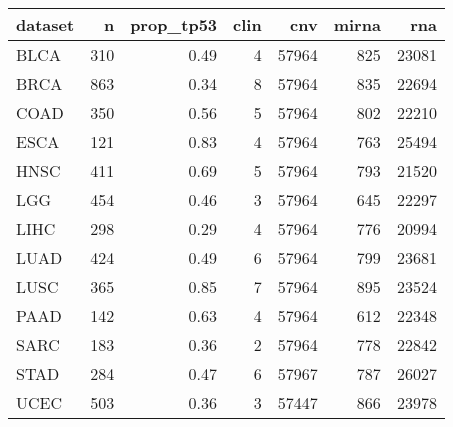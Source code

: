 \begin{table}[ht]
\centering
\begin{tabular}{lrrrrrr}
  \hline
dataset & n & prop\_tp53 & clin & cnv & mirna & rna \\ 
  \hline
BLCA & 310 & 0.49 &   4 & 57964 & 825 & 23081 \\ 
  BRCA & 863 & 0.34 &   8 & 57964 & 835 & 22694 \\ 
  COAD & 350 & 0.56 &   5 & 57964 & 802 & 22210 \\ 
  ESCA & 121 & 0.83 &   4 & 57964 & 763 & 25494 \\ 
  HNSC & 411 & 0.69 &   5 & 57964 & 793 & 21520 \\ 
  LGG & 454 & 0.46 &   3 & 57964 & 645 & 22297 \\ 
  LIHC & 298 & 0.29 &   4 & 57964 & 776 & 20994 \\ 
  LUAD & 424 & 0.49 &   6 & 57964 & 799 & 23681 \\ 
  LUSC & 365 & 0.85 &   7 & 57964 & 895 & 23524 \\ 
  PAAD & 142 & 0.63 &   4 & 57964 & 612 & 22348 \\ 
  SARC & 183 & 0.36 &   2 & 57964 & 778 & 22842 \\ 
  STAD & 284 & 0.47 &   6 & 57967 & 787 & 26027 \\ 
  UCEC & 503 & 0.36 &   3 & 57447 & 866 & 23978 \\ 
   \hline
\end{tabular}
\end{table}
